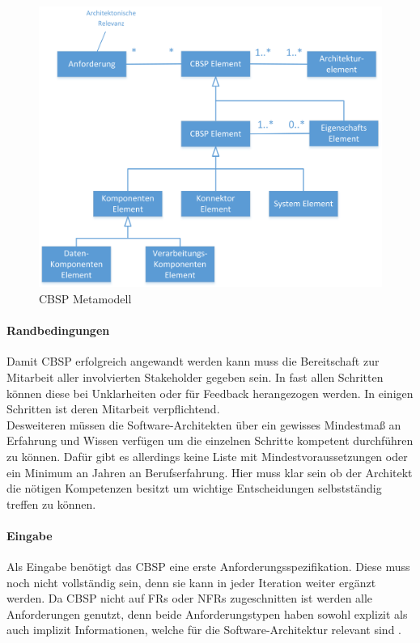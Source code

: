 \begin{figure}[h]
	\centering
	\includegraphics[scale=0.6]{cbsp_meta_model.png} 
	\caption{CBSP Metamodell \cite{Gru01}}
	\label{fig_cbsp_meta_model}
\end{figure}

\paragraph{Randbedingungen}

Damit CBSP erfolgreich angewandt werden kann muss die Bereitschaft zur Mitarbeit aller involvierten Stakeholder gegeben sein. In fast allen Schritten k\"onnen diese bei Unklarheiten oder f\"ur Feedback herangezogen werden. In einigen Schritten ist deren Mitarbeit verpflichtend. \\
Desweiteren m\"ussen die Software-Architekten \"uber ein gewisses Mindestma\ss{} an Erfahrung und Wissen verf\"ugen um die einzelnen Schritte kompetent durchf\"uhren zu k\"onnen. Daf\"ur gibt es allerdings keine Liste mit Mindestvoraussetzungen oder ein Minimum an Jahren an Berufserfahrung. Hier muss klar sein ob der Architekt die n\"otigen Kompetenzen besitzt um wichtige Entscheidungen selbstst\"andig treffen zu k\"onnen. \\

\paragraph{Eingabe}

Als Eingabe ben\"otigt das CBSP eine erste Anforderungsspezifikation. Diese muss noch nicht vollst\"andig sein, denn sie kann in jeder Iteration weiter erg\"anzt werden. Da CBSP nicht auf FRs oder NFRs zugeschnitten ist werden alle Anforderungen genutzt, denn beide Anforderungstypen haben sowohl explizit als auch implizit Informationen, welche f\"ur die Software-Architektur relevant sind \cite{Gru01}. \\


